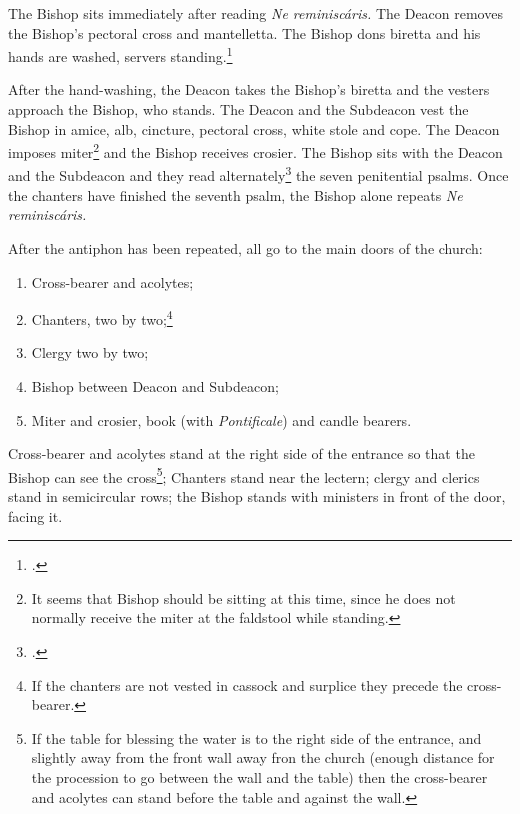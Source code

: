 \documentclass[letterpaper]{report}
\begin{document}
{    \rubric The Bishop sits immediately after reading \textit{Ne
    reminisc\'aris.} The Deacon removes the Bishop's pectoral cross and
    mantelletta. The Bishop dons biretta and his hands are washed, servers
    standing.\footcite[See][note 1, p. 39.]{consecranda}

    \rubric After the hand-washing, the Deacon takes the Bishop's biretta and
    the vesters approach the Bishop, who stands. The Deacon and the Subdeacon
    vest the Bishop in amice, alb, cincture, pectoral cross, white stole and
    cope. The Deacon imposes miter\footnote{It seems that Bishop should be
    sitting at this time, since he does not normally receive the miter at the
    faldstool while standing.} and the Bishop receives crosier. The Bishop sits
    with the Deacon and the Subdeacon and they read alternately\footcite[The
    bishop usually reads the first verse of each psalm and recites the verse
    \textit{Gloria Patri.}][note 3, p. 39.]{consecranda} the seven penitential
    psalms. Once the chanters have finished the seventh psalm, the Bishop alone
    repeats \textit{Ne reminisc\'aris.}

    \rubric After the antiphon has been repeated, all go to the main doors of the
    church:

    \begin{enumerate}

        \item Cross-bearer and acolytes;

        \item Chanters, two by two;\footnote{If the chanters are not vested in
            cassock and surplice they precede the cross-bearer.}

        \item Clergy two by two;

        \item Bishop between Deacon and Subdeacon;

        \item Miter and crosier, book (with \textit{Pontificale}) and candle
            bearers.

    \end{enumerate}

    Cross-bearer and acolytes stand at the right side of the entrance so that
    the Bishop can see the cross\footnote{If the table for blessing the water
    is to the right side of the entrance, and slightly away from the front wall
    away fron the church (enough distance for the procession to go between the
    wall and the table) then the cross-bearer and acolytes can stand before the
    table and against the wall.}; Chanters stand near the lectern; clergy and
    clerics stand in semicircular rows; the Bishop stands with ministers in
    front of the door, facing it.

}
\end{document}

